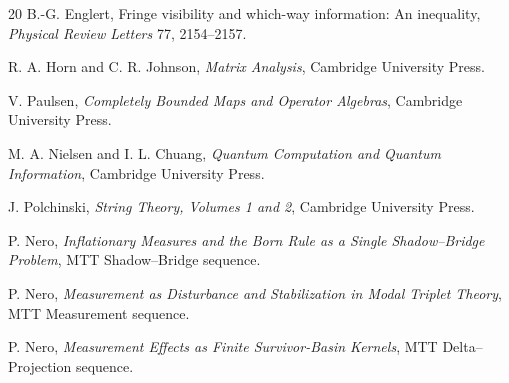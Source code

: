 \documentclass[11pt]{article}
\begin{document}
\begin{thebibliography}{20}
B.-G. Englert,
Fringe visibility and which-way information: An inequality,
\emph{Physical Review Letters} 77, 2154--2157.

R. A. Horn and C. R. Johnson,
\emph{Matrix Analysis},
Cambridge University Press.

V. Paulsen,
\emph{Completely Bounded Maps and Operator Algebras},
Cambridge University Press.

M. A. Nielsen and I. L. Chuang,
\emph{Quantum Computation and Quantum Information},
Cambridge University Press.

J. Polchinski,
\emph{String Theory, Volumes 1 and 2},
Cambridge University Press.

P. Nero,
\emph{Inflationary Measures and the Born Rule as a Single Shadow--Bridge Problem},
MTT Shadow--Bridge sequence.

P. Nero,
\emph{Measurement as Disturbance and Stabilization in Modal Triplet Theory},
MTT Measurement sequence.

P. Nero,
\emph{Measurement Effects as Finite Survivor-Basin Kernels},
MTT Delta--Projection sequence.

\end{thebibliography}
\end{document}
